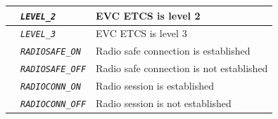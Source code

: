 \begin{itemize}
\begin{longtable}{|l|l|l|}
			\hline

			&	\begin{minipage}[t]{0.40\linewidth} \emph{\texttt{LEVEL\_2}} \end{minipage}
			&	\begin{minipage}[t]{0.38\linewidth} EVC ETCS is level 2 \end{minipage} \\

			\hline

			&	\begin{minipage}[t]{0.40\linewidth} \emph{\texttt{LEVEL\_3}} \end{minipage}
			&	\begin{minipage}[t]{0.38\linewidth} EVC ETCS is level 3 \end{minipage} \\

			\hline

			&	\begin{minipage}[t]{0.40\linewidth} \emph{\texttt{RADIOSAFE\_ON}} \end{minipage}
			&	\begin{minipage}[t]{0.38\linewidth} Radio safe connection is established \end{minipage} \\

			\hline

			&	\begin{minipage}[t]{0.40\linewidth} \emph{\texttt{RADIOSAFE\_OFF}} \end{minipage}
			&	\begin{minipage}[t]{0.38\linewidth} Radio safe connection is not established \end{minipage} \\

			\hline

			&	\begin{minipage}[t]{0.40\linewidth} \emph{\texttt{RADIOCONN\_ON}} \end{minipage}
			&	\begin{minipage}[t]{0.38\linewidth} Radio session is established \end{minipage} \\

			\hline

			&	\begin{minipage}[t]{0.40\linewidth} \emph{\texttt{RADIOCONN\_OFF}} \end{minipage}
			&	\begin{minipage}[t]{0.38\linewidth} Radio session is not established \end{minipage} \\


\end{longtable}
\end{itemize}
